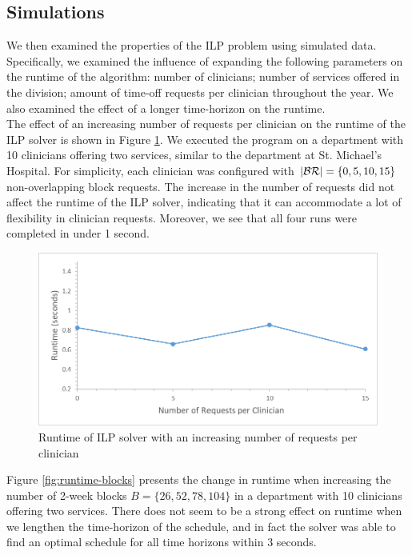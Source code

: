 

\subsection{Simulations}
We then examined the properties of the ILP problem using simulated data. Specifically, we examined the influence of expanding the following parameters on the runtime of the algorithm: number of clinicians; number of services offered in the division; amount of time-off requests per clinician throughout the year. We also examined the effect of a longer time-horizon on the runtime. \\

The effect of an increasing number of requests per clinician on the runtime of the ILP solver is shown in Figure \ref{fig:runtime-requests}. We executed the program on a department with 10 clinicians offering two services, similar to the department at St. Michael's Hospital. For simplicity, each clinician was configured with $\abs{\mathcal{BR}} = \{0, 5, 10, 15\}$ non-overlapping block requests. The increase in the number of requests did not affect the runtime of the ILP solver, indicating that it can accommodate a lot of flexibility in clinician requests. Moreover, we see that all four runs were completed in under 1 second. \\

\begin{figure}[h]
	\centering
	\includegraphics[scale=.5]{fig/runtime_requests}
	\caption{Runtime of ILP solver with an increasing number of requests per clinician}
	\label{fig:runtime-requests}
\end{figure}

Figure \ref{fig:runtime-blocks} presents the change in runtime when increasing the number of 2-week blocks $B = \{26, 52, 78, 104\}$ in a department with 10 clinicians offering two services. There does not seem to be a strong effect on runtime when we lengthen the time-horizon of the schedule, and in fact the solver was able to find an optimal schedule for all time horizons within 3 seconds. \\ %

